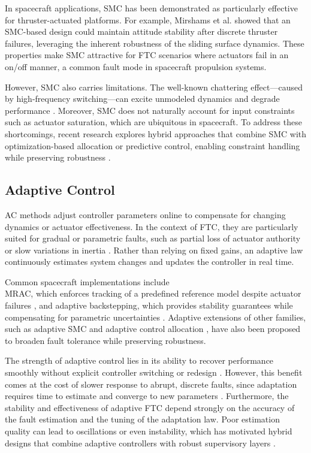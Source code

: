 In spacecraft applications, SMC has been demonstrated as particularly effective for thruster-actuated platforms. For example, Mirshams et al. \cite{Mirshams2014PassiveThrusters} showed that an SMC-based design could maintain attitude stability after discrete thruster failures, leveraging the inherent robustness of the sliding surface dynamics. These properties make SMC attractive for \gls{FTC} scenarios where actuators fail in an on/off manner, a common fault mode in spacecraft propulsion systems.

However, SMC also carries limitations. The well-known chattering effect—caused by high-frequency switching—can excite unmodeled dynamics and degrade performance \cite{Yang2023AdaptiveFaults}. Moreover, SMC does not naturally account for input constraints such as actuator saturation, which are ubiquitous in spacecraft. To address these shortcomings, recent research explores hybrid approaches that combine SMC with optimization-based allocation or predictive control, enabling constraint handling while preserving robustness \cite{Khodaverdian2023Fault-tolerantSpacecraft}
.


\subsection{Adaptive Control}
\gls{AC} methods adjust controller parameters online to compensate for changing dynamics or actuator effectiveness. In the context of \gls{FTC}, they are particularly suited for gradual or parametric faults, such as partial loss of actuator authority or slow variations in inertia \cite{Jiang2012Fault-tolerantApproaches,Yin2016ASystem}. Rather than relying on fixed gains, an adaptive law continuously estimates system changes and updates the controller in real time.

Common spacecraft implementations include \\
\gls{MRAC}, which enforces tracking of a predefined reference model despite actuator failures \cite{Ma2014ActuatorFeedback}, and adaptive backstepping, which provides stability guarantees while compensating for parametric uncertainties \cite{Bustan2014AdaptiveControl}. Adaptive extensions of other families, such as adaptive SMC \cite{Yang2023AdaptiveFaults} and adaptive control allocation \cite{Tohidi2016FaultSpace}, have also been proposed to broaden fault tolerance while preserving robustness.

The strength of adaptive control lies in its ability to recover performance smoothly without explicit controller switching or redesign \cite{Jiang2012Fault-tolerantApproaches}. However, this benefit comes at the cost of slower response to abrupt, discrete faults, since adaptation requires time to estimate and converge to new parameters \cite{Zhang2008BibliographicalSystems}. Furthermore, the stability and effectiveness of adaptive FTC depend strongly on the accuracy of the fault estimation and the tuning of the adaptation law. Poor estimation quality can lead to oscillations or even instability, which has motivated hybrid designs that combine adaptive controllers with robust supervisory layers \cite{Zhang2008BibliographicalSystems,Jiang2012Fault-tolerantApproaches}.

